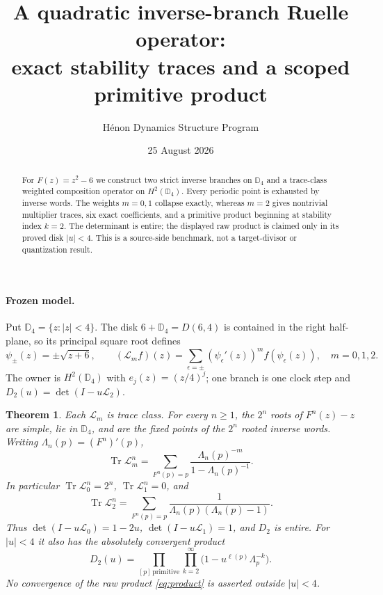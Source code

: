 \documentclass[10pt]{article}
\title{A quadratic inverse-branch Ruelle operator:\\exact stability traces and a scoped primitive product}
\author{H\'enon Dynamics Structure Program}
\date{25 August 2026}
\newtheorem{theorem}{Theorem}
\newcommand{\D}{\mathbb D}
\newcommand{\Lop}{\mathcal L}
\newcommand{\Tr}{\operatorname{Tr}}
\begin{document}
\maketitle
\begin{abstract}
For $F(z)=z^2-6$ we construct two strict inverse branches on $\D_4$ and a trace-class weighted composition operator on $H^2(\D_4)$.  Every periodic point is exhausted by inverse words.  The weights $m=0,1$ collapse exactly, whereas $m=2$ gives nontrivial multiplier traces, six exact coefficients, and a primitive product beginning at stability index $k=2$.  The determinant is entire; the displayed raw product is claimed only in its proved disk $|u|<4$.  This is a source-side benchmark, not a target-divisor or quantization result.
\end{abstract}

\paragraph{Frozen model.}
Put $\D_4=\{z:|z|<4\}$.  The disk $6+\D_4=D(6,4)$ is contained in the right half-plane, so its principal square root defines
\[
 \psi_\pm(z)=\pm\sqrt{z+6},\qquad
 (\Lop_m f)(z)=\sum_{\epsilon=\pm}(\psi_\epsilon'(z))^m
 f(\psi_\epsilon(z)),\quad m=0,1,2.
\]
The owner is $H^2(\D_4)$ with $e_j(z)=(z/4)^j$; one branch is one clock step and $D_2(u)=\det(I-u\Lop_2)$.

\begin{theorem}\label{thm:main}
Each $\Lop_m$ is trace class.  For every $n\ge1$, the $2^n$ roots of $F^n(z)-z$ are simple, lie in $\D_4$, and are the fixed points of the $2^n$ rooted inverse words.  Writing $\Lambda_n(p)=(F^n)'(p)$,
\begin{equation}\label{eq:trace}
 \Tr\Lop_m^n=\sum_{F^n(p)=p}
 \frac{\Lambda_n(p)^{-m}}{1-\Lambda_n(p)^{-1}}.
\end{equation}
In particular $\Tr\Lop_0^n=2^n$, $\Tr\Lop_1^n=0$, and
\[
 \Tr\Lop_2^n=\sum_{F^n(p)=p}\frac1{\Lambda_n(p)(\Lambda_n(p)-1)}.
\]
Thus $\det(I-u\Lop_0)=1-2u$, $\det(I-u\Lop_1)=1$, and $D_2$ is entire.  For $|u|<4$ it also has the absolutely convergent product
\begin{equation}\label{eq:product}
 D_2(u)=\prod_{[p]\,\mathrm{primitive}}\prod_{k=2}^{\infty}
 \bigl(1-u^{\ell(p)}\Lambda_p^{-k}\bigr).
\end{equation}
No convergence of the raw product \eqref{eq:product} is asserted outside $|u|<4$.
\end{theorem}
\end{document}
